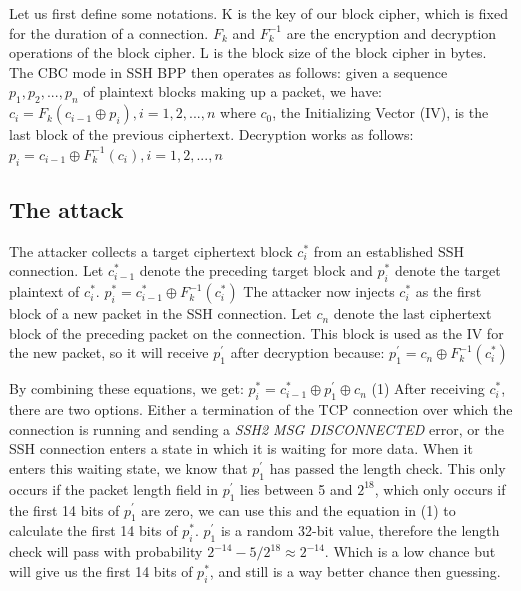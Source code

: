 \documentclass[twocolumn]{article}
\begin{document}
\indent Let us first define some notations. K is the key of our block cipher, which is fixed for the duration of a connection. $F_k$ and $F^{-1}_k$ are the encryption and decryption operations of the block cipher. L is the block size of the block cipher in bytes. The CBC mode in SSH BPP then operates as follows: given a sequence $p_1,p_2,...,p_n$ of plaintext blocks making up a packet, we have: 
$c_i = F_k(c_{i-1} \oplus p_i), i = 1,2,...,n$
where $c_0$, the Initializing Vector (IV), is the last block of the previous ciphertext. Decryption works as follows: $p_i = c_{i-1} \oplus F^{-1}_k(c_i), i = 1,2,...,n$

\subsection*{The attack}

The attacker collects a target ciphertext block $c_i^*$ from an established SSH connection. Let $c_{i-1}^*$ denote the preceding target block and $p_i^*$ denote the target plaintext of $c_i^*$.
$p_i^* = c_{i-1}^* \oplus F^{-1}_k(c_i^*)$
The attacker now injects $c_i^*$ as the first block of a new packet in the SSH connection. Let $c_n$ denote the last ciphertext block of the preceding packet on the connection. This block is used as the IV for the new packet, so it will receive $p^{'}_1$ after decryption because: $p^{'}_1 = c_n \oplus F^{-1}_k(c_i^*)$


\indent By combining these equations, we get: $p_i^* = c_{i-1}^* \oplus p^{'}_1 \oplus c_n$ (1)
After receiving $c_i^*$, there are two options. Either a termination of the TCP connection over which the connection is running and sending a \textit{SSH2 MSG DISCONNECTED} error, or the SSH connection enters a state in which it is waiting for more data. When it enters this waiting state, we know that $p^{'}_1$ has passed the length check. This only occurs if the packet length field in $p^{'}_1$ lies between 5 and $2^{18}$, which only occurs if the first 14 bits of $p^{'}_1$ are zero, we can use this and the equation in (1) to calculate the first 14 bits of $p_i^*$. $p^{'}_1$ is a random 32-bit value, therefore the length check will pass with probability $2^{-14} - 5/2^{18} \approx 2^{-14}$. Which is a low chance but will give us the first 14 bits of $p^*_i$, and still is a way better chance then guessing.


\end{document}
